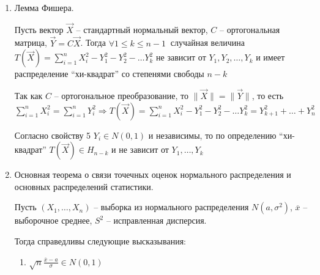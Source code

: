 \begin{enumerate}
\begin{enumerate}
        \item $\letsymbol$ случайный вектор $\xi \in N(\vec a, K)$.
        Тогда его координаты независимы тогда и только тогда, когда они не коррелированы (то есть матрица ковариаций $K$ диагональная)

        \underline{Следствие}. Если плотность совместного распределения случайных величин $\xi$ и $\eta$ ненулевая, то они независимы тогда и только тогда, 
        когда их коэффициент корреляции равен нулю
    \end{enumerate}

    \item Лемма Фишера.

    \begin{MyTheorem}
         Пусть вектор $\vec X$ -- стандартный нормальный вектор, $C$ -- ортогональная матрица, $\vec Y = C \vec X$.
        Тогда $\forall 1 \leq k \leq n - 1 \ $ случайная величина $T(\vec X) = \sum_{i = 1}^n X_i^2 - Y_1^2 - Y_2^2 - \dots Y_k^2$ 
        не зависит от $Y_1, Y_2, \dots, Y_k$ и имеет распределение \enquote{хи-квадрат} со степенями свободы $n - k$
    \end{MyTheorem}

    \begin{MyProof}
        Так как $C$ -- ортогональное преобразование, то $\|\vec X\| = \|\vec Y\|$, то есть $\sum_{i = 1}^n X^2_i = \sum_{i = 1}^n Y^2_i \Longrightarrow
        T(\vec X) = \sum_{i = 1}^n X_i^2 - Y_1^2 - Y_2^2 - \dots Y_k^2 = Y^2_{k + 1} + \dots + Y^2_{n}$

        Согласно свойству 5 $Y_i \in N(0, 1)$ и независимы, то по определению \enquote{хи-квадрат} $T(\vec X) \in H_{n - k}$ и не зависит от $Y_1, \dots, Y_k$
    \end{MyProof}

    \item Основная теорема о связи точечных оценок нормального распределения и основных распределений статистики.

    \begin{MyTheorem}
        \Ths Пусть $(X_1, \dots, X_n)$ -- выборка из нормального распределения $N(a, \sigma^2)$, $\overline{x}$ -- выборочное среднее, $S^2$ -- исправленная дисперсия.

        Тогда справедливы следующие высказывания:

        \begin{enumerate}
            \item $\sqrt{n} \frac{\overline{x} - a}{\sigma} \in N(0, 1)$
            

\end{enumerate}
\end{MyTheorem}
\end{enumerate}
